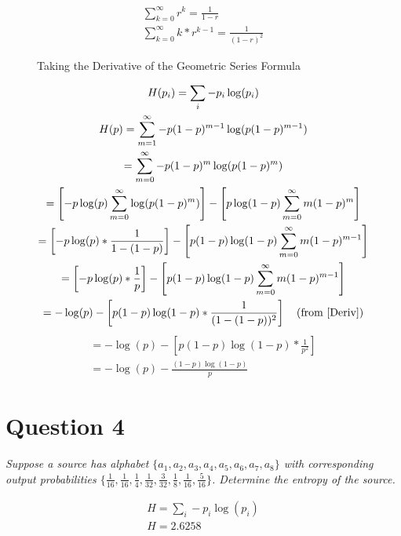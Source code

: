 \documentclass[12pt]{report}
\begin{document}
\begin{figure}[H]
    \begin{gather}
        \displaystyle\sum_{k=0}^{\infty} r^k = \frac{1}{1-r} \\
        \displaystyle\sum_{k=0}^{\infty} k*r^{k-1} = \frac{1}{(1-r)^2} \label{Deriv}
    \end{gather}
    \caption{Taking the Derivative of the Geometric Series Formula}
\end{figure}


\begin{gather}
    H(p_i) = \displaystyle\sum_{i} -p_i \log(p_i) \\
    H(p) = \displaystyle\sum_{m=1}^{\infty} -p(1-p)^{m-1} \log(p(1-p)^{m-1}) \\
    = \displaystyle\sum_{m=0}^{\infty} -p(1-p)^{m} \log(p(1-p)^{m}) \\
    = \left[ -p \log(p) \displaystyle\sum_{m=0}^{\infty} \log(p(1-p)^{m}) \right] - 
            \left[ p \log(1-p) \displaystyle\sum_{m=0}^{\infty} m(1-p)^{m} \right] \\
    = \left[ -p \log(p) * \frac{1}{1-(1-p)} \right] - 
            \left[ p(1-p) \log(1-p) \displaystyle\sum_{m=0}^{\infty} m(1-p)^{m-1} \right] \\
    = \left[ -p \log(p) * \frac{1}{p} \right] - 
            \left[ p(1-p) \log(1-p) \displaystyle\sum_{m=0}^{\infty} m(1-p)^{m-1} \right] \\
    = -\log(p) - 
            \left[ p(1-p) \log(1-p) * \frac{1}{(1-(1-p))^2} \right] \quad 
            (\text{from \ref{Deriv}}) 
\end{gather}
\begin{gather}
    = -\log(p) - \left[ p(1-p) \log(1-p) * \frac{1}{p^2} \right] \\
    = -\log(p) - \frac{(1-p) \log(1-p)}{p}
\end{gather}

\section*{Question 4}
\textit{Suppose a source has alphabet $\{ a_1, a_2, a_3, a_4, a_5, a_6, a_7, a_8 \}$ with corresponding output probabilities $\{ \frac{1}{16}, \frac{1}{16}, \frac{1}{4}, \frac{1}{32}, \frac{3}{32}, \frac{1}{8}, \frac{1}{16}, \frac{5}{16} \}$. Determine the entropy of the source.}

\begin{gather}
    H = \displaystyle\sum_{i} -p_i \log(p_i) \\
    H = 2.6258 \label{Huffman Entropy}
\end{gather}
\end{document}
